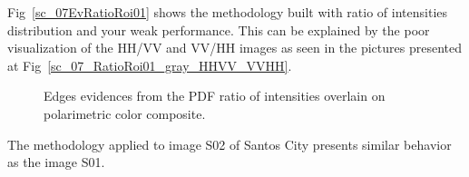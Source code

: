 \documentclass[remotesensing,article,submit,pdftex,moreauthors]{Definitions/mdpi}
\begin{document}
Fig~\eqref{sc_07EvRatioRoi01} shows the methodology built with ratio of intensities distribution and your weak performance. This can be explained by the poor visualization of the HH/VV and VV/HH images as seen in the pictures presented at  Fig~\eqref{sc_07_RatioRoi01_gray_HHVV_VVHH}.   
\begin{figure}[hbt]
	\centering
     \caption{Edges evidences from the PDF ratio of intensities overlain on polarimetric color composite.}
     \label{sc_07EvRatioRoi01} 
   \end{figure}

The methodology applied to image S02 of Santos City presents similar behavior as the image S01.
%
\end{document}
